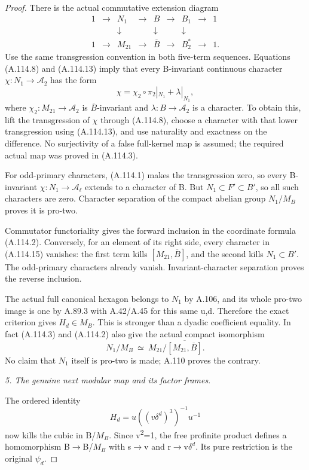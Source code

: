 \begin{proof}
There is the actual commutative extension diagram
\[
\begin{array}{ccccccccc}
1&\to&N_1&\to&B&\to&B_1&\to&1\\
 &&\downarrow&&\downarrow&&\downarrow\\
1&\to&M_{21}&\to&\overline B&\to&B_2^*&\to&1 .
\end{array}                                                  \tag{A.114.14}
\]
Use the same transgression convention in both five-term sequences. Equations (A.114.8) and (A.114.13) imply that every B-invariant continuous character \(\chi:N_1\to\mathcal A_2\) has the form
\[
\chi=\chi_2\circ\pi_2|_{N_1}+\lambda|_{N_1},                  \tag{A.114.15}
\]
where \(\chi_2:M_{21}\to\mathcal A_2\) is \(\overline B\)-invariant and \(\lambda:B\to\mathcal A_2\) is a character. To obtain this, lift the transgression of \(\chi\) through (A.114.8), choose a character with that lower transgression using (A.114.13), and use naturality and exactness on the difference. No surjectivity of a false full-kernel map is assumed; the required actual map was proved in (A.114.3).

For odd-primary characters, (A.114.1) makes the transgression zero, so every B-invariant \(\chi:N_1\to\mathcal A_\ell\) extends to a character of B. But \(N_1\subset F'\subset B'\), so all such characters are zero. Character separation of the compact abelian group \(N_1/M_B\) proves it is pro-two.

Commutator functoriality gives the forward inclusion in the coordinate formula (A.114.2). Conversely, for an element of its right side, every character in (A.114.15) vanishes: the first term kills \([M_{21},\overline B]\), and the second kills \(N_1\subset B'\). The odd-primary characters already vanish. Invariant-character separation proves the reverse inclusion.

The actual full canonical hexagon belongs to \(N_1\) by A.106, and its whole pro-two image is one by A.89.3 with A.42/A.45 for this same u,d. Therefore the exact criterion gives \(H_d\in M_B\). This is stronger than a dyadic coefficient equality. In fact (A.114.3) and (A.114.2) also give the actual compact isomorphism
\[
N_1/M_B\ \simeq\ 
M_{21}/\overline{[M_{21},\overline B]}.
\]
No claim that \(N_1\) itself is pro-two is made; A.110 proves the contrary.

\medskip\noindent\emph{5. The genuine next modular map and its factor frames}.

The ordered identity
\[
H_d=u((v\delta^d)^3)^{-1}u^{-1}
\]
now kills the cubic in B/\(M_B\). Since v\textsuperscript{2}=1, the free profinite product defines a homomorphism B\(\to\)B/\(M_B\) with s\(\to\)v and r\(\to\)v\(\delta^d\). Its pure restriction is the original \(\psi_d\).


\end{proof}
